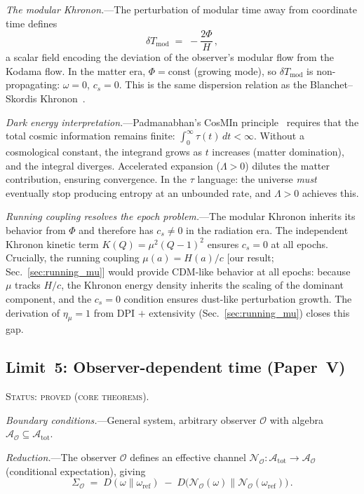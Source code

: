 \documentclass[prd,twocolumn,superscriptaddress,longbibliography,floatfix]{revtex4-2}
\newcommand{\chan}{\mathcal{N}}
\newcommand{\KL}{D}
\newcommand{\tauasym}{\tau}
\newcommand{\Aobs}{\mathcal{A}_{\mathcal{O}}}
\newcommand{\Atot}{\mathcal{A}_{\mathrm{tot}}}
\newcommand{\SigO}{\Sigma_{\mathcal{O}}}
\newcommand{\Tmod}{T_{\mathrm{mod}}}
\begin{document}
\emph{The modular Khronon.}---The perturbation of
modular time away from coordinate time defines
\begin{equation}
\delta\Tmod \;=\; -\frac{2\Phi}{H}\,,
\label{eq:modular_khronon}
\end{equation}
a scalar field encoding the deviation of the observer's
modular flow from the Kodama flow.  In the matter era,
$\Phi = \mathrm{const}$ (growing mode), so $\delta\Tmod$
is non-propagating: $\omega = 0$, $c_s = 0$.
This is the same dispersion relation as the
Blanchet--Skordis Khronon~\cite{BlanchetSkordis2024}.

\emph{Dark energy interpretation.}---Padmanabhan's CosMIn
principle~\cite{Padmanabhan2017} requires that the
total cosmic information remains finite:
$\int_0^\infty \tauasym(t)\,dt < \infty$.  Without a
cosmological constant, the integrand grows as $t$
increases (matter domination), and the integral diverges.
Accelerated expansion ($\Lambda > 0$) dilutes the matter
contribution, ensuring convergence.  In the
$\tauasym$ language: the universe \emph{must} eventually
stop producing entropy at an unbounded rate, and
$\Lambda > 0$ achieves this.

\emph{Running coupling resolves the epoch
problem.}---The modular Khronon inherits its behavior
from $\Phi$ and therefore has $c_s \neq 0$ in the
radiation era.  The independent Khronon kinetic term
$K(Q) = \mu^2(Q-1)^2$ ensures $c_s = 0$ at all epochs.
Crucially, the running coupling $\mu(a) = H(a)/c$
[our result; Sec.~\ref{sec:running_mu}] would provide
CDM-like behavior at all epochs: because $\mu$ tracks
$H/c$, the Khronon energy density inherits the scaling
of the dominant component, and the $c_s = 0$ condition
ensures dust-like perturbation growth.  The derivation
of $\eta_\mu = 1$ from DPI $+$ extensivity
(Sec.~\ref{sec:running_mu}) closes this gap.


\subsection{Limit~5: Observer-dependent time (Paper~V)}
\label{sec:limit_observer}

\textsc{Status: proved (core theorems).}

\emph{Boundary conditions.}---General system, arbitrary
observer $\mathcal{O}$ with algebra
$\Aobs \subseteq \Atot$.

\emph{Reduction.}---The observer $\mathcal{O}$ defines an
effective channel
$\chan_{\mathcal{O}}: \Atot \to \Aobs$
(conditional expectation), giving
\begin{equation}
\SigO \;=\; \KL(\omega\|\omega_{\mathrm{ref}})
\;-\; \KL\!\bigl(\chan_{\mathcal{O}}(\omega)\|
\chan_{\mathcal{O}}(\omega_{\mathrm{ref}})\bigr)\,.
\label{eq:sigma_O}
\end{equation}
\end{document}

